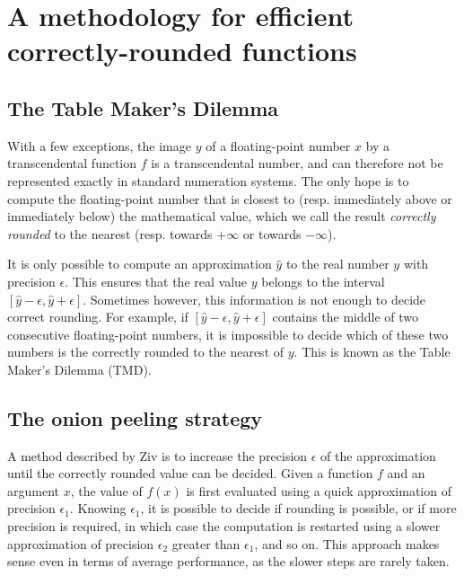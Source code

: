 \section{A methodology for efficient correctly-rounded functions}
\label{section:methodology}


\subsection{The Table Maker's Dilemma}

With a few exceptions, the image $y$ of a floating-point number $x$ by
a transcendental function $f$ is a transcendental number, and can
therefore not be represented exactly in standard numeration systems.
The only hope is to compute the floating-point number that is closest
to (resp.  immediately above or immediately below) the mathematical
value, which we call the result \emph{correctly rounded} to the
nearest (resp.  towards $+\infty$ or towards $-\infty$).

It is only possible to compute an approximation $\hat{y}$ to the real
number $y$ with precision $\epsilon$. This ensures that the real value
$y$ belongs to the interval $[\hat{y}-\epsilon , \hat{y}+\epsilon]$.
Sometimes however, this information is not enough to decide correct
rounding. For example, if $[\hat{y}-\epsilon , \hat{y}+\epsilon]$
contains the middle of two consecutive floating-point numbers, it is
impossible to decide which of these two numbers is the correctly
rounded to the nearest of $y$. This is known as the Table Maker's
Dilemma (TMD).

\subsection{The onion peeling strategy}

A method described by Ziv \cite{Ziv91} is to increase the precision
$\epsilon$ of the approximation until the correctly rounded value can
be decided.  Given a function $f$ and an argument $x$, the value of
$f(x)$ is first evaluated using a quick approximation of precision
$\epsilon_1$.  Knowing $\epsilon_1$, it is possible to decide if
rounding is possible, or if more precision is required, in which case
the computation is restarted using a slower approximation of precision
$\epsilon_2$ greater than $\epsilon_1$, and so on. This approach makes
sense even in terms of average performance, as the slower steps are
rarely taken.

